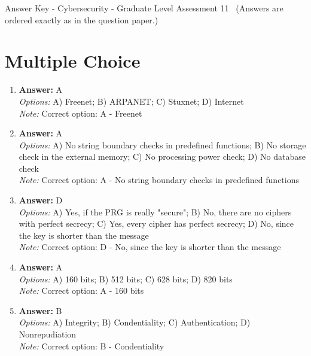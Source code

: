 \documentclass[12pt]{article}
\begin{document}
\begin{center}
Answer Key - Cybersecurity - Graduate Level Assessment 11 \
\small (Answers are ordered exactly as in the question paper.)
\end{center}

\section*{Multiple Choice}
\begin{enumerate}[label=\arabic*.]
\item \textbf{Answer:} A
\\ \textit{Options:} A) Freenet; B) ARPANET; C) Stuxnet; D) Internet
\\ \textit{Note:} Correct option: A - Freenet
\item \textbf{Answer:} A
\\ \textit{Options:} A) No string boundary checks in predefined functions; B) No storage check in the external memory; C) No processing power check; D) No database check
\\ \textit{Note:} Correct option: A - No string boundary checks in predefined functions
\item \textbf{Answer:} D
\\ \textit{Options:} A) Yes, if the PRG is really "secure"; B) No, there are no ciphers with perfect secrecy; C) Yes, every cipher has perfect secrecy; D) No, since the key is shorter than the message
\\ \textit{Note:} Correct option: D - No, since the key is shorter than the message
\item \textbf{Answer:} A
\\ \textit{Options:} A) 160 bits; B) 512 bits; C) 628 bits; D) 820 bits
\\ \textit{Note:} Correct option: A - 160 bits
\item \textbf{Answer:} B
\\ \textit{Options:} A) Integrity; B) Condentiality; C) Authentication; D) Nonrepudiation
\\ \textit{Note:} Correct option: B - Condentiality
\end{enumerate}
\end{document}
